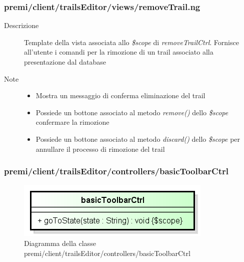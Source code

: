 \subsubsection{premi/client/trailsEditor/views/removeTrail.ng}

\begin{description}
\item[Descrizione] \hfill
	Template della vista associata allo \textit{\$scope} di \textit{removeTrailCtrl}. Fornisce all'utente i comandi per la rimozione di un trail associato alla presentazione dal database
\item[Note] \hfill
	\begin{itemize}
			\item Mostra un messaggio di conferma eliminazione del trail
			\item Possiede un bottone associato al metodo \textit{remove()} dello \textit{\$scope} confermare la rimozione
			\item Possiede un bottone associato al metodo \textit{discard()} dello \textit{\$scope} per annullare il processo di rimozione del trail
	\end{itemize}
\end{description}

































\subsubsection{premi/client/trailsEditor/controllers/basicToolbarCtrl}
\begin{figure}[H]
\begin{center}
\includegraphics[scale=0.85]{img/diacla/basicToolbarCtrl.png}
\caption{Diagramma della classe premi/client/trailsEditor/controllers/basicToolbarCtrl}
\end{center}
\end{figure}


